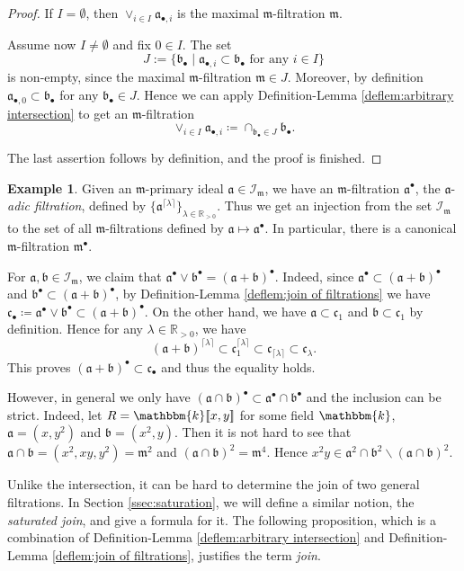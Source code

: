 \documentclass[11pt, leqno]{amsart}%
\theoremstyle{plain}
\theoremstyle{definition}
\newtheorem{example}[theorem]{Example}
\theoremstyle{remark}
\newcommand{\cI}{\mathcal{I}}
\newcommand{\bR}{\mathbb{R}}
\newcommand{\fa}{\mathfrak{a}}
\newcommand{\fb}{\mathfrak{b}}
\newcommand{\fc}{\mathfrak{c}}
\newcommand{\fm}{\mathfrak{m}}
\newcommand{\bk}{\mathbbm{k}}
\numberwithin{equation}{section}
\begin{document}
\begin{proof}
    If $I=\emptyset$, then $\vee_{i\in I}\fa_{\bullet,i}$ is the maximal $\fm$-filtration $\fm$. 
	
    Assume now $I\ne\emptyset$ and fix $0\in I$. The set
    \[
        J:=\{\fb_\bullet\mid \fa_{\bullet,i}\subset \fb_\bullet \text{ for any } i\in I\}
    \]
    is non-empty, since the maximal $\fm$-filtration $\fm\in J$. Moreover, by definition $\fa_{\bullet,0}\subset\fb_\bullet$ for any $\fb_\bullet\in J$. Hence we can apply Definition-Lemma \ref{deflem:arbitrary intersection} to get an $\fm$-filtration
    \[
        \vee_{i\in I}\fa_{\bullet,i}\coloneqq \cap_{\fb_\bullet\in J}\fb_\bullet.
    \]
    
    The last assertion follows by definition, and the proof is finished.
\end{proof}

\begin{example}\label{eg:ideal join}
    Given an $\fm$-primary ideal $\fa\in\cI_\fm$, we have an $\fm$-filtration $\fa^\bullet$, the $\fa$-\emph{adic filtration}, defined by $\{\fa^{\lceil\lambda\rceil}\}_{\lambda\in\bR_{>0}}$. Thus we get an injection from the set $\cI_\fm$ to the set of all $\fm$-filtrations defined by $\fa\mapsto\fa^\bullet$. In particular, there is a canonical $\fm$-filtration $\fm^\bullet$. 
	
    For $\fa,\fb\in\cI_\fm$, we claim that $\fa^\bullet\vee\fb^\bullet=(\fa+\fb)^\bullet$. Indeed, since $\fa^\bullet\subset (\fa+\fb)^\bullet$ and $\fb^\bullet\subset (\fa+\fb)^\bullet$, by Definition-Lemma \ref{deflem:join of filtrations} we have $\fc_\bullet\coloneqq\fa^\bullet\vee\fb^\bullet\subset (\fa+\fb)^\bullet$. On the other hand, we have $\fa\subset\fc_1$ and $\fb\subset\fc_1$ by definition. Hence for any $\lambda\in\bR_{>0}$, we have 
    \[
        (\fa+\fb)^{\lceil\lambda\rceil}\subset\fc_1^{\lceil\lambda\rceil}\subset\fc_{\lceil\lambda\rceil}\subset\fc_\lambda.
    \]
    This proves $(\fa+\fb)^\bullet\subset\fc_\bullet$ and thus the equality holds.
	
    However, in general we only have $(\fa\cap\fb)^\bullet\subset\fa^\bullet\cap\fb^\bullet$ and the inclusion can be strict. Indeed, let $R=\bk[\![x,y]\!]$ for some field $\bk$, $\fa=(x,y^2)$ and $\fb=(x^2,y)$. Then it is not hard to see that $\fa\cap\fb=(x^2,xy,y^2)=\fm^2$ and $(\fa\cap\fb)^2=\fm^4$. Hence $x^2y\in\fa^2\cap\fb^2\backslash (\fa\cap\fb)^2$.
\end{example}

Unlike the intersection, it can be hard to determine the join of two general filtrations. In Section \ref{ssec:saturation}, we will define a similar notion, the \emph{saturated join}, and give a formula for it.
The following proposition, which is a combination of Definition-Lemma \ref{deflem:arbitrary intersection} and Definition-Lemma \ref{deflem:join of filtrations}, justifies the term \emph{join}.
\end{document}
